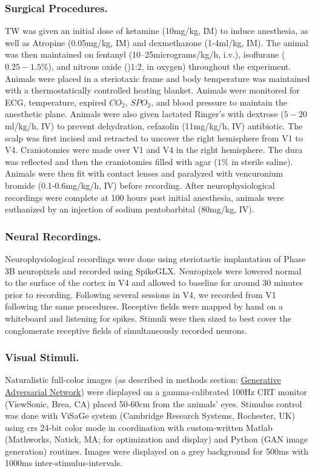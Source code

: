 \subsubsection*{Surgical Procedures.}
TW was given an initial dose of ketamine (10mg/kg, IM) to induce anesthesia, as well as Atropine (0.05mg/kg, IM) and dexmethazone (1-4ml/kg, IM). The animal was then maintained on fentanyl (10–25micrograms/kg/h, i.v.), isoflurane ($0.25-1.5\%$), and nitrous oxide ()1:2, in oxygen) throughout the experiment. Animals were placed in a steriotaxic frame and body temperature was maintained with a thermostatically controlled heating blanket. Animals were monitored for ECG, temperature, expired $CO_2$, $SPO_2$, and blood pressure to maintain the anesthetic plane. Animals were also given lactated Ringer's with dextrose ($5-20$ml/kg/h, IV) to prevent dehydration, cefazolin (11mg/kg/h, IV) antibiotic. The scalp was first incised and retracted to uncover the right hemisphere from V1 to V4. Craniotomies were made over V1 and V4 in the right hemisphere. The dura was reflected and then the craniotomies filled with agar ($1\%$ in sterile saline). Animals were then fit with contact lenses and paralyzed with vencuronium bromide (0.1-0.6mg/kg/h, IV) before recording. After neurophysiological recordings were complete at 100 hours post initial anesthesia, animals were euthanized by an injection of sodium pentobarbital (80mg/kg, IV).

\subsubsection*{Neural Recordings.}
Neurophysiological recordings were done using steriotactic implantation of Phase 3B neuropixels \parencite{Jun2017} and recorded using SpikeGLX. Neuropixels were lowered normal to the surface of the cortex in V4 and allowed to baseline for around 30 minutes prior to recording. Following several sessions in V4, we recorded from V1 following the same procedures. Receptive fields were mapped by hand on a whiteboard and listening for spikes. Stimuli were then sized to best cover the conglomerate receptive fields of simultaneously recorded neurons.

\subsubsection*{Visual Stimuli.}
Naturalistic full-color images (as described in methods section: \hyperref[{methods:gan}]{Generative Adversarial Network}) were displayed on a gamma-calibrated 100Hz CRT monitor (ViewSonic, Brea, CA) placed 50-60cm from the animals' eyes. Stimulus control was done with ViSaGe system (Cambridge Research Systems, Rochester, UK) using crs 24-bit color mode in coordination with custom-written Matlab (Mathworks, Natick, MA; for optimization and display) and Python (GAN image generation) routines. Images were displayed on a grey background for 500ms with 1000ms inter-stimulus-intervals. 

